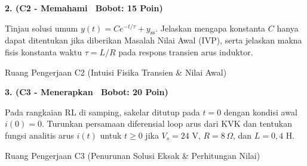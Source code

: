 \documentclass[10pt,a4paper]{article}
\begin{document}
\vspace{1mm}

\noindent\textbf{2. (C2 - Memahami \textbar\ Bobot: 15 Poin)}\par\vspace{0.5mm}
{\footnotesize Tinjau solusi umum $y(t) = C e^{-t/\tau} + y_{\text{ss}}$. Jelaskan mengapa konstanta $C$ hanya dapat ditentukan jika diberikan Masalah Nilai Awal (IVP), serta jelaskan makna fisis konstanta waktu $\tau = L/R$ pada respons transien arus induktor.}
\begin{answerbox}{Ruang Pengerjaan C2 (Intuisi Fisika Transien \& Nilai Awal)}
  \vspace{2.1cm}
\end{answerbox}

\vspace{1mm}

\noindent\textbf{3. (C3 - Menerapkan \textbar\ Bobot: 20 Poin)}\par\vspace{0.5mm}
\noindent\begin{minipage}[t]{0.60\textwidth}%
  {\footnotesize Pada rangkaian RL di samping, sakelar ditutup pada $t=0$ dengan kondisi awal $i(0) = 0$. Turunkan persamaan diferensial loop arus dari KVK dan tentukan fungsi analitis arus $i(t)$ untuk $t \ge 0$ jika $V_s = 24\text{ V}$, $R = 8\,\Omega$, dan $L = 0{,}4\text{ H}$.}%
\end{minipage}%
\hfill%
\begin{minipage}[t]{0.37\textwidth}%
  \centering
\end{minipage}\par\vspace{1mm}
\begin{answerbox}{Ruang Pengerjaan C3 (Penurunan Solusi Eksak \& Perhitungan Nilai)}
  \vspace{2.8cm}
\end{answerbox}

\newpage
\end{document}
